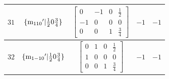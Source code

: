 \documentclass[fleqn,8pt]{jsarticle}
\begin{document}
\begin{longtable}{ccccc}
$ 31 $ & $ \{{\rm m}_{110}{}'|\frac{1}{2} 0 \frac{3}{4}\} $ & $ \begin{bmatrix} 0 & -1 & 0 & \frac{1}{2} \\ -1 & 0 & 0 & 0 \\ 0 & 0 & 1 & \frac{3}{4} \end{bmatrix} $ & $ -1 $ & $ -1 $ \\ \hline
$ 32 $ & $ \{{\rm m}_{1-10}{}'|\frac{1}{2} 0 \frac{3}{4}\} $ & $ \begin{bmatrix} 0 & 1 & 0 & \frac{1}{2} \\ 1 & 0 & 0 & 0 \\ 0 & 0 & 1 & \frac{3}{4} \end{bmatrix} $ & $ -1 $ & $ -1 $ \\
\end{longtable}
\end{document}
